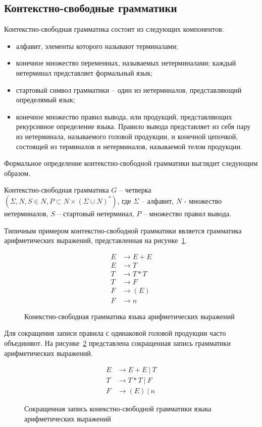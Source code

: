 \subsection{Контекстно-свободные грамматики}
Контекстно-свободная грамматика состоит из следующих компонентов:
\begin{itemize}
    \item алфавит, элементы которого называют терминалами;
    \item конечное множество переменных, называемых нетерминалами; каждый нетерминал представляет формальный язык;
    \item стартовый символ грамматики -- один из нетерминалов, представляющий определямый язык;
    \item конечное множество правил вывода, или продукций, представляющих рекурсивное определение языка.
    Правило вывода представляет из себя пару из нетерминала, называемого головой продукции, и конечной цепочкой,
    состоящей из терминалов и нетерминалов, называемой телом продукции.
\end{itemize}
Формальное определение контекстно-свободной грамматики выглядит следующим образом.
\begin{definition}
Контекстно-свободная грамматика $G$ -- четверка $(\Sigma, N, S \in N, P \subset N \times (\Sigma \cup N)^*)$,
где $\Sigma$ -- алфавит, $N$ - множество нетерминалов, $S$ -- стартовый нетерминал, $P$ -- множество правил вывода.
\end{definition}
Типичным примером контекстно-свободной грамматики является грамматика арифметических выражений, представленная на рисунке~\ref{cf-expr}.
\begin{figure}
    \begin{align*}
        E &\rightarrow E + E\\
        E &\rightarrow T\\
        T &\rightarrow T * T\\
        T &\rightarrow F\\
        F &\rightarrow (E)\\
        F &\rightarrow n
    \end{align*}
    \caption{Конекстно-свободная грамматика языка арифметических выражений}
    \label{cf-expr}
\end{figure}

Для сокращения записи правила с одинаковой головой продукции часто объединяют. На рисунке~\ref{cf-expr-short} представлена сокращенная запись грамматики арифметических выражений.
\begin{figure}
    \begin{align*}
        E &\rightarrow E + E\ |\ T\\
        T &\rightarrow T * T\ |\ F\\
        F &\rightarrow (E)\ |\ n
    \end{align*}
    \caption{Сокращенная запись конекстно-свободной грамматики языка арифметических выражений}
    \label{cf-expr-short}
\end{figure}
\FloatBarrier
